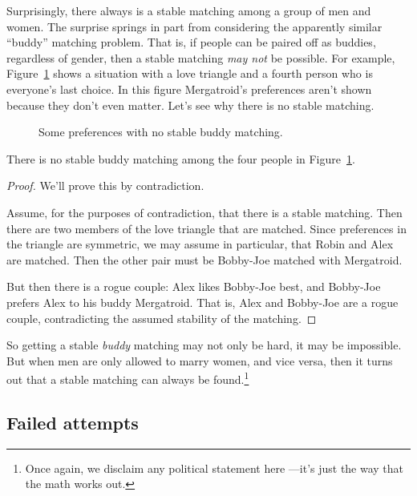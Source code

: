 Surprisingly, there always is a stable matching among a group of men
and women.  The surprise springs in part from considering the
apparently similar ``buddy'' matching problem.  That is, if people can
be paired off as buddies, regardless of gender, then a stable matching
\emph{may not} be possible.  For example, Figure~\ref{fig:buddy} shows
a situation with a love triangle and a fourth person who is everyone's
last choice.  In this figure Mergatroid's preferences aren't shown
because they don't even matter.  Let's see why there is no stable
matching.

\begin{figure}[htbp]


\caption{Some preferences with no stable buddy matching.}
\label{fig:buddy}
\end{figure}

\begin{lemma}\label{lem:nostablematch}
There is no stable buddy matching among the four people in
Figure~\ref{fig:buddy}.
\end{lemma}

\begin{proof}
We'll prove this by contradiction.

Assume, for the purposes of contradiction, that there is a stable
matching.  Then there are two members of the love triangle that are
matched.  Since preferences in the triangle are symmetric, we may assume
in particular, that Robin and Alex are matched.  Then the other pair must
be Bobby-Joe matched with Mergatroid.

But then there is a rogue couple: Alex likes Bobby-Joe best, and Bobby-Joe
prefers Alex to his buddy Mergatroid.  That is, Alex and Bobby-Joe are a
rogue couple, contradicting the assumed stability of the matching.
\end{proof}

So getting a stable \emph{buddy} matching may not only be hard, it may
be impossible.  But when men are only allowed to marry women, and
vice versa, then it turns out that a stable matching can always be
found.\footnote{Once again, we disclaim any political statement
  here ---it's just the way that the math works out.}


\iffalse

\subsection{Failed attempts}


